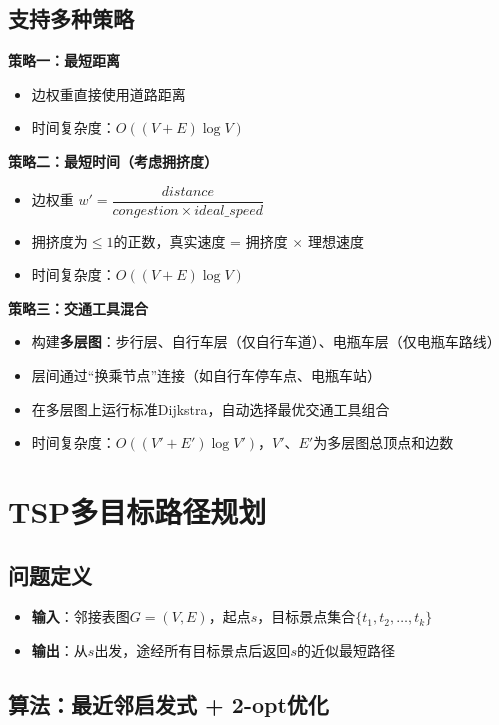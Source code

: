\documentclass[12pt,a4paper]{report}
\begin{document}
\subsection{支持多种策略}

\textbf{策略一：最短距离}
\begin{itemize}
    \item 边权重直接使用道路距离
    \item 时间复杂度：$O((V+E) \log V)$
\end{itemize}

\textbf{策略二：最短时间（考虑拥挤度）}
\begin{itemize}
    \item 边权重 $w' = \dfrac{distance}{congestion \times ideal\_speed}$
    \item 拥挤度为$\leq 1$的正数，真实速度 = 拥挤度 $\times$ 理想速度
    \item 时间复杂度：$O((V+E) \log V)$
\end{itemize}

\textbf{策略三：交通工具混合}
\begin{itemize}
    \item 构建\textbf{多层图}：步行层、自行车层（仅自行车道）、电瓶车层（仅电瓶车路线）
    \item 层间通过``换乘节点''连接（如自行车停车点、电瓶车站）
    \item 在多层图上运行标准Dijkstra，自动选择最优交通工具组合
    \item 时间复杂度：$O((V' + E') \log V')$，$V'$、$E'$为多层图总顶点和边数
\end{itemize}


\section{TSP多目标路径规划}

\subsection{问题定义}

\begin{itemize}
    \item \textbf{输入}：邻接表图$G=(V,E)$，起点$s$，目标景点集合$\{t_1, t_2, \ldots, t_k\}$
    \item \textbf{输出}：从$s$出发，途经所有目标景点后返回$s$的近似最短路径
\end{itemize}

\subsection{算法：最近邻启发式 + 2-opt优化}
\end{document}
